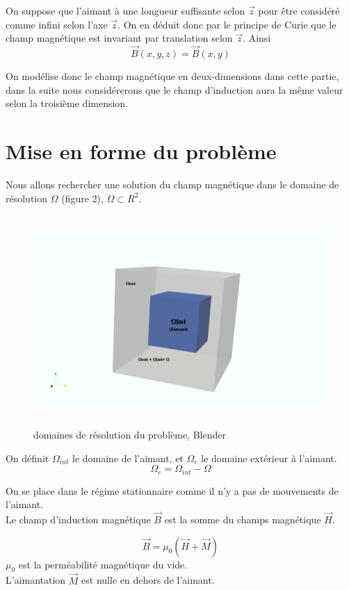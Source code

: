 \documentclass[a4paper,12pt,titlepage]{report}
\begin{document}
\begin{onehalfspace}
On suppose que l'aimant à une longueur suffisante selon $\vec{z}$ pour être considéré comme infini selon l'axe $\vec{z}$.
On en déduit donc par le principe de Curie que le champ magnétique est invariant par translation selon $\vec{z}$. 
Ainsi \[\vec{B}(x,y,z) = \vec{B}(x,y)\]

On modélise donc le champ magnétique en deux-dimensions dans cette partie, dans la suite nous considérerons que le champ d'induction aura la même valeur selon la troisième dimension.
\section{Mise en forme du problème}

Nous allons rechercher une solution du champ magnétique dans le domaine de résolution $\Omega$ (figure 2), $\Omega \subset R^{2}$. \\
\begin{figure}[h]
\begin{center}
\includegraphics[height = 8cm, keepaspectratio]{graphes/Espacedetravail.png} 
\caption{domaines de résolution du problème, Blender}
\label{figure 2}
\end{center}
\end{figure}
On définit $\Omega_{int}$ le domaine de l'aimant, et $\Omega_{e}$ le domaine extérieur à l'aimant. 
\[\Omega_{e} = \Omega_{int} - \Omega\]

\newpage
On se place dans le régime stationnaire comme il n'y a pas de mouvements de l'aimant. \\
Le champ d'induction magnétique $\vec{B}$ est la somme du champs magnétique $\vec{H}$.

\[\vec{B}=\mu _{0}(\vec{H}+\vec{M})\]
$\mu _{0}$ est la perméabilité magnétique du vide. \\
L'aimantation $\vec{M}$ est nulle en dehors de l'aimant.
 

\end{onehalfspace}
\end{document}
